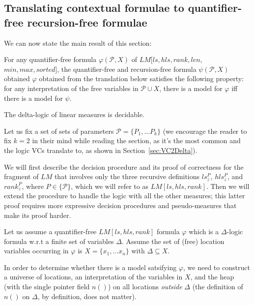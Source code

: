 \subsection{Translating contextual formulae to quantifier-free recursion-free formulae}
We can now state the main result of this section:

\begin{theorem}
\label{decidableLMbig}
	For any quantifier-free formula $\varphi(\mathcal{P}, X)$ of $LM[ls, hls, rank, len, $\\$min, max, sorted]$, the quantifier-free and recursion-free
	formula $\psi(\mathcal{P}, X)$ obtained $\varphi$ obtained from the translation below
	satisfies the following property: for any interpretation of the free variables
	in $\mathcal{P} \cup X$, there is a model for $\varphi$ iff there is a model for $\psi$.
\end{theorem}


\begin{corollary}
	The delta-logic of linear measures is decidable.
\end{corollary}

Let us fix a set of sets of parameters $\mathcal{P} = \{P_1, \ldots P_k\}$
(we encourage the reader to fix $k=2$ in their mind while reading the section, as it's the
most common and the logic VCs translate to, as shown in Section~\ref{sec:VC2Delta}).

We will first describe the decision procedure and its proof of correctness for the fragment
of $LM$ that involves only the three recursive definitions $ls_z^P$, $hls_z^P$, and $rank_z^P$,
where $P \in \{\mathcal{P}\}$, which we will refer to as $LM[ls,hls,rank]$. 
Then we will extend the procedure to handle the logic with all the other measures; this latter
proof requires more expressive decision procedures and pseudo-measures that make its proof harder.

Let us assume a quantifier-free $LM[ls,hls,rank]$ formula $\varphi$ which is a $\Delta$-logic formula
w.r.t a finite set of variables $\Delta$.
Assume the set of (free) location variables occurring in $\varphi$ is $X = \{x_1, \ldots x_n\}$ with
$\Delta \subseteq X$. 

In order to determine whether there is a model satsifying $\varphi$, we need to construct a universe
of locations, an interpretation of the variables in $X$, and the heap
(with the single pointer field $n()$) on all locations \emph{outside} $\Delta$ (the definition
of $n()$ on $\Delta$, by definition, does not matter).

